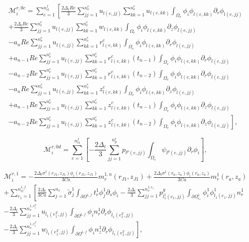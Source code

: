 \documentclass{article}
\begin{document}
\begin{equation}
\begin{array}{l} \mathcal{M}_i^{r,0c} = \sum_{e=1}^{n_{el}^f} \left[ \frac{2\Delta_t Re}{3} \sum_{jj=1}^{n_v^e} u_{l(e,jj)} \sum_{kk=1}^{n_v^e} u_{l(e,kk)} \int_{\Omega_e} \phi_i \phi_{l(e,kk)} \partial_r \phi_{l(e,jj)} \right. \\ + \frac{2\Delta_t Re}{3} \sum_{jj=1}^{n_v^e} u_{l(e,jj)} \sum_{kk=1}^{n_v^e} w_{l(e,kk)} \int_{\Omega_e} \phi_i \phi_{l(e,kk)} \partial_z \phi_{l(e,jj)} \\ - a_n Re \sum_{jj=1}^{n_v^e} u_{l(e,jj)} \sum_{kk=1}^{n_v^e} r_{l(e,kk)}^c \int_{\Omega_e} \phi_i \phi_{l(e,kk)} \partial_r \phi_{l(e,jj)} \\ + a_{n-1} Re \sum_{jj=1}^{n_v^e} u_{l(e,jj)} \sum_{kk=1}^{n_v^e} r_{l(e,kk)}^c(t_{n-1}) \int_{\Omega_e} \phi_i \phi_{l(e,kk)} \partial_r \phi_{l(e,jj)} \\ - a_{n-2} Re \sum_{jj=1}^{n_v^e} u_{l(e,jj)} \sum_{kk=1}^{n_v^e} r_{l(e,kk)}^c(t_{n-2}) \int_{\Omega_e} \phi_i \phi_{l(e,kk)} \partial_r \phi_{l(e,jj)} \\ - a_n Re \sum_{jj=1}^{n_v^e} u_{l(e,jj)} \sum_{kk=1}^{n_v^e} z_{l(e,kk)}^c \int_{\Omega_e} \phi_i \phi_{l(e,kk)} \partial_z \phi_{l(e,jj)} \\ + a_{n-1} Re \sum_{jj=1}^{n_v^e} u_{l(e,jj)} \sum_{kk=1}^{n_v^e} z_{l(e,kk)}^c(t_{n-1}) \int_{\Omega_e} \phi_i \phi_{l(e,kk)} \partial_z \phi_{l(e,jj)} \\ \left. - a_{n-2} Re \sum_{jj=1}^{n_v^e} u_{l(e,jj)} \sum_{kk=1}^{n_v^e} z_{l(e,kk)}^c(t_{n-2}) \int_{\Omega_e} \phi_i \phi_{l(e,kk)} \partial_z \phi_{l(e,jj)} \right], \end{array} \tag{4.116}
\end{equation}

\begin{equation}
\mathcal{M}_i^{r,0d} = \sum_{e=1}^{n_{el}^f} \left[ -\frac{2\Delta_t}{3} \sum_{jj=1}^{n_p^e} p_{l^p(e,jj)} \int_{\Omega_e} \psi_{l^p(e,jj)} \partial_r \phi_i \right], \tag{4.117}
\end{equation}

\begin{equation}
\begin{array}{l} \mathcal{M}_i^{r,1} = -\frac{2\Delta_t \sigma^1(r_{J1},z_{J1})\phi_i(r_{J1},z_{J1})}{3Ca} m_r^{1,n}(r_{J1},z_{J1}) + \frac{2\Delta_t \sigma^1(r_a,z_a)\phi_i(r_a,z_a)}{3Ca} m_r^{1}(r_a,z_a) \\ + \sum_{e_1=1}^{n_{el}^{1,f}} \left[ \frac{2\Delta_t}{3Ca} \sum_{j=1}^{n_v} \tilde{\sigma}_j^1 \int_{\partial \Omega^{1,f}} t_r^1 \phi_j^1 \partial_s \phi_i - \frac{2\Delta_t}{3} \sum_{jj=1}^{n_v^{1,e_1}} p_{l_1^1(e_1,jj)}^g \int_{\partial \Omega_{e_1}^{1}} \phi_i^1 \phi_{l_1(e_1,jj)}^1 n_r^1 \right. \\ - \frac{2\Delta_t}{3} \sum_{jj=1}^{n_v^{1,e_1^T}} u_{l_1(e_1^T,jj)} \int_{\partial \Omega^{1,f}} \phi_i n_r^1 \partial_r \phi_{l_1(e_1^T,jj)} \\ \left. - \frac{2\Delta_t}{3} \sum_{jj=1}^{n_v^{1,e_1^T}} w_{l_1(e_1^T,jj)} \int_{\partial \Omega^{1,f}} \phi_i n_z^1 \partial_r \phi_{l_1(e_1^T,jj)} \right], \end{array} \tag{4.118}
\end{equation}
\end{document}
